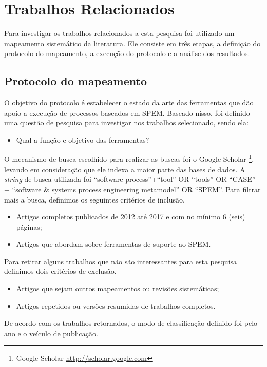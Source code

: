 \section{Trabalhos Relacionados}\label{sec:trabalhosRelacionados}
Para investigar os trabalhos relacionados a esta pesquisa foi utilizado um mapeamento sistemático da literatura. Ele consiste em três etapas, a definição do protocolo do mapeamento, a execução do protocolo e a análise dos resultados.


\subsection{Protocolo do mapeamento}\label{sub:trabalhosRelacionados_metodologia}
O objetivo do protocolo é estabelecer o estado da arte das ferramentas que dão apoio a execução de processos baseados em SPEM. Baseado nisso, foi definido uma questão de pesquisa para investigar nos trabalhos selecionado, sendo ela:

\begin{itemize}
	\item Qual a função e objetivo das ferramentas?
\end{itemize}

O mecanismo de busca escolhido para realizar as buscas foi o Google Scholar \footnote{Google Scholar \url{http://scholar.google.com}}, levando em consideração que ele indexa a maior parte das bases de dados. A \textit{string} de busca utilizada foi ``software process''+``tool'' OR ``tools'' OR ``CASE'' + ``software \& systems process engineering metamodel'' OR ``SPEM''. Para filtrar mais a busca, definimos os seguintes critérios de inclusão.

\begin{itemize}
	\item Artigos completos publicados de 2012 até 2017 e com no mínimo 6 (seis) páginas;
	\item Artigos que abordam sobre ferramentas de suporte ao SPEM.
\end{itemize}

Para retirar alguns trabalhos que não são interessantes para esta pesquisa definimos dois critérios de exclusão.
\begin{itemize}
	\item Artigos que sejam outros mapeamentos ou revisões sistemáticas;
	\item Artigos repetidos ou versões resumidas de trabalhos completos.
\end{itemize}
De acordo com os trabalhos retornados, o modo de classificação definido foi pelo ano e o veículo de publicação.

